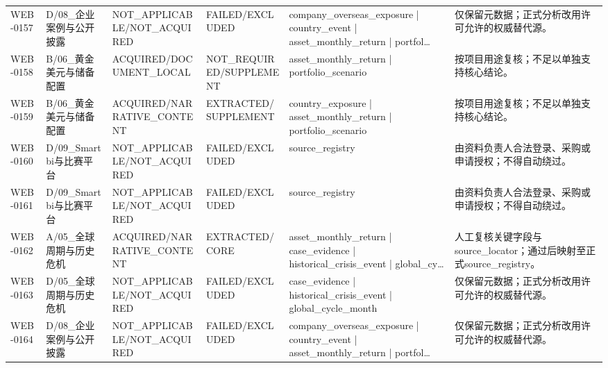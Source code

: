 \begin{landscape}
\begin{longtable}{p{1.8cm}p{2.6cm}p{2.6cm}p{2.6cm}p{4.8cm}p{7.2cm}}
WEB-0157 & D/\allowbreak{}08\_\allowbreak{}企业案例与公开披露 & NOT\_\allowbreak{}APPLICABLE/\allowbreak{}NOT\_\allowbreak{}ACQUIRED & FAILED/\allowbreak{}EXCLUDED & company\_\allowbreak{}overseas\_\allowbreak{}exposure | country\_\allowbreak{}event | asset\_\allowbreak{}monthly\_\allowbreak{}return | portfol… & 仅保留元数据；正式分析改用许可允许的权威替代源。\\
WEB-0158 & B/\allowbreak{}06\_\allowbreak{}黄金美元与储备配置 & ACQUIRED/\allowbreak{}DOCUMENT\_\allowbreak{}LOCAL & NOT\_\allowbreak{}REQUIRED/\allowbreak{}SUPPLEMENT & asset\_\allowbreak{}monthly\_\allowbreak{}return | portfolio\_\allowbreak{}scenario & 按项目用途复核；不足以单独支持核心结论。\\
WEB-0159 & B/\allowbreak{}06\_\allowbreak{}黄金美元与储备配置 & ACQUIRED/\allowbreak{}NARRATIVE\_\allowbreak{}CONTENT & EXTRACTED/\allowbreak{}SUPPLEMENT & country\_\allowbreak{}exposure | asset\_\allowbreak{}monthly\_\allowbreak{}return | portfolio\_\allowbreak{}scenario & 按项目用途复核；不足以单独支持核心结论。\\
WEB-0160 & D/\allowbreak{}09\_\allowbreak{}Smartbi与比赛平台 & NOT\_\allowbreak{}APPLICABLE/\allowbreak{}NOT\_\allowbreak{}ACQUIRED & FAILED/\allowbreak{}EXCLUDED & source\_\allowbreak{}registry & 由资料负责人合法登录、采购或申请授权；不得自动绕过。\\
WEB-0161 & D/\allowbreak{}09\_\allowbreak{}Smartbi与比赛平台 & NOT\_\allowbreak{}APPLICABLE/\allowbreak{}NOT\_\allowbreak{}ACQUIRED & FAILED/\allowbreak{}EXCLUDED & source\_\allowbreak{}registry & 由资料负责人合法登录、采购或申请授权；不得自动绕过。\\
WEB-0162 & A/\allowbreak{}05\_\allowbreak{}全球周期与历史危机 & ACQUIRED/\allowbreak{}NARRATIVE\_\allowbreak{}CONTENT & EXTRACTED/\allowbreak{}CORE & asset\_\allowbreak{}monthly\_\allowbreak{}return | case\_\allowbreak{}evidence | historical\_\allowbreak{}crisis\_\allowbreak{}event | global\_\allowbreak{}cy… & 人工复核关键字段与source\_\allowbreak{}locator；通过后映射至正式source\_\allowbreak{}registry。\\
WEB-0163 & D/\allowbreak{}05\_\allowbreak{}全球周期与历史危机 & NOT\_\allowbreak{}APPLICABLE/\allowbreak{}NOT\_\allowbreak{}ACQUIRED & FAILED/\allowbreak{}EXCLUDED & case\_\allowbreak{}evidence | historical\_\allowbreak{}crisis\_\allowbreak{}event | global\_\allowbreak{}cycle\_\allowbreak{}month & 仅保留元数据；正式分析改用许可允许的权威替代源。\\
WEB-0164 & D/\allowbreak{}08\_\allowbreak{}企业案例与公开披露 & NOT\_\allowbreak{}APPLICABLE/\allowbreak{}NOT\_\allowbreak{}ACQUIRED & FAILED/\allowbreak{}EXCLUDED & company\_\allowbreak{}overseas\_\allowbreak{}exposure | country\_\allowbreak{}event | asset\_\allowbreak{}monthly\_\allowbreak{}return | portfol… & 仅保留元数据；正式分析改用许可允许的权威替代源。\\

\end{longtable}
\end{landscape}
